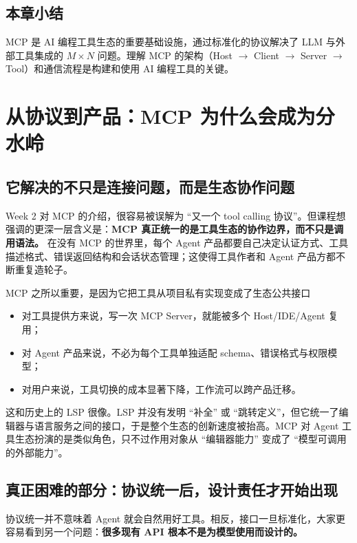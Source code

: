 \documentclass[a4paper]{article}
\begin{document}
\subsection{本章小结}

MCP 是 AI 编程工具生态的重要基础设施，通过标准化的协议解决了 LLM 与外部工具集成的 $M \times N$ 问题。理解 MCP 的架构（Host $\rightarrow$ Client $\rightarrow$ Server $\rightarrow$ Tool）和通信流程是构建和使用 AI 编程工具的关键。

\section{从协议到产品：MCP 为什么会成为分水岭}

\subsection{它解决的不只是连接问题，而是生态协作问题}
Week 2 对 MCP 的介绍，很容易被误解为 ``又一个 tool calling 协议''。但课程想强调的更深一层含义是：\textbf{MCP 真正统一的是工具生态的协作边界，而不只是调用语法。} 在没有 MCP 的世界里，每个 Agent 产品都要自己决定认证方式、工具描述格式、错误返回结构和会话状态管理；这使得工具作者和 Agent 产品方都不断重复造轮子。

\begin{importantbox}{MCP 之所以重要，是因为它把工具从项目私有实现变成了生态公共接口}
\begin{itemize}
    \item 对工具提供方来说，写一次 MCP Server，就能被多个 Host/IDE/Agent 复用；
    \item 对 Agent 产品来说，不必为每个工具单独适配 schema、错误格式与权限模型；
    \item 对用户来说，工具切换的成本显著下降，工作流可以跨产品迁移。
\end{itemize}
\end{importantbox}

这和历史上的 LSP 很像。LSP 并没有发明 ``补全'' 或 ``跳转定义''，但它统一了编辑器与语言服务之间的接口，于是整个生态的创新速度被抬高。MCP 对 Agent 工具生态扮演的是类似角色，只不过作用对象从 ``编辑器能力'' 变成了 ``模型可调用的外部能力''。

\subsection{真正困难的部分：协议统一后，设计责任才开始出现}
协议统一并不意味着 Agent 就会自然用好工具。相反，接口一旦标准化，大家更容易看到另一个问题：\textbf{很多现有 API 根本不是为模型使用而设计的。}
\end{document}
